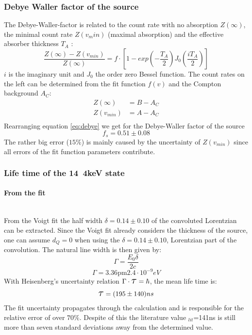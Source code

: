\subsubsection{Debye Waller factor of the source}
The Debye-Waller-factor is related to the count rate with no absorption $Z(\infty)$, the minimal count rate $Z(v_min)$ (maximal absorption) and the effective absorber thickness $T_A$ \cite{Wegener}:
\begin{equation}
\frac{Z(\infty)-Z(v_{min})}{Z(\infty)}=f\cdot [1-exp(-\frac{T_A}{2})J_0(\frac{iT_A}{2})]
\label{eq:debye}
\end{equation}
$i$ is the imaginary unit and $J_0$ the order zero Bessel function. The count rates on the left can be determined from the fit function $f(v)$ and the Compton background $A_C$:
\begin{equation}
\begin{aligned}
Z(\infty) &= B - A_C\\
Z(v_{min}) &= A-A_C\\
\end{aligned}
\end{equation}
Rearranging equation \ref{eq:debye} we get for the Debye-Waller factor of the source
\begin{equation}
f_s= 0.51\pm0.08
\end{equation}
The rather big error ($15\%$) is mainly caused by the uncertainty of $Z(v_{min})$ since all errors of the fit function parameters contribute.

\subsubsection{Life time of the \unit{14.4}{keV} state}
\paragraph{From the fit}\ \\
From the Voigt fit the half width $\delta = 0.14 \pm 0.10$ of the convoluted Lorentzian can be extracted. Since the Voigt fit already considers the thickness of the source, one can assume $d_Q=0$ when using the  $\delta = 0.14 \pm 0.10$, Lorentzian part of the convolution. The natural line width is then given by:
\begin{equation}
\Gamma  = \frac{E_0 \delta}{2c}
\end{equation}
\begin{equation}
\Gamma  = \unit{3.36\pm2.4\cdot 10^{-9}}{eV}
\end{equation}
With Heisenberg's uncertainty relation $\Gamma \cdot \scalebox{1.5}{$\tau$}=\hbar$, the mean life time is:
\begin{equation}
\scalebox{1.5}{$\tau$}= (195\pm140)ns
\end{equation}
The fit uncertainty propagates through the calculation and is responsible for the 
relative error of over $70\%$. Despite of this the literature value \scalebox{1.5}{$\tau$}$_{lit}$=141ns is still more than seven standard deviations away from the determined value.

